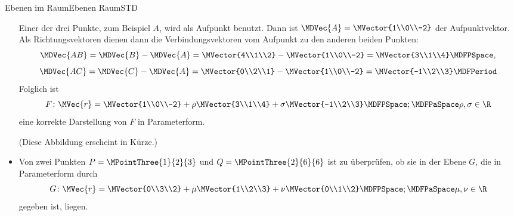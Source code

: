 \begin{MXContent}{Ebenen im Raum}{Ebenen Raum}{STD}
\begin{MExample}
\begin{itemize}
 Einer der drei Punkte, zum Beispiel $A$, wird als Aufpunkt benutzt. Dann ist $\MDVec{A}=\MVector{1\\0\\-2}$ der Aufpunktvektor. Als Richtungsvektoren dienen dann die Verbindungsvektoren vom Aufpunkt zu den anderen beiden Punkten:
 \[
  \MDVec{A B} = \MDVec{B}-\MDVec{A}=\MVector{4\\1\\2}-\MVector{1\\0\\-2}=\MVector{3\\1\\4}\MDFPSpace,
 \]
 \[
  \MDVec{A C} = \MDVec{C}-\MDVec{A}=\MVector{0\\2\\1}-\MVector{1\\0\\-2}=\MVector{-1\\2\\3}\MDFPeriod
 \]
 Folglich ist
 \[
  F\colon\MVec{r}=\MVector{1\\0\\-2}+\rho\MVector{3\\1\\4}+\sigma\MVector{-1\\2\\3}\MDFPSpace;\MDFPaSpace\rho,\sigma\in\R
 \]
 eine korrekte Darstellung von $F$ in Parameterform.
  
 (Diese Abbildung erscheint in Kürze.)
 
 \item Von zwei Punkten $P=\MPointThree{1}{2}{3}$ und $Q=\MPointThree{2}{6}{6}$ ist zu überprüfen, ob sie in der Ebene $G$, die in Parameterform durch
 \[
  G\colon\MVec{r}=\MVector{0\\3\\2}+\mu\MVector{1\\2\\3}+\nu\MVector{0\\1\\2}\MDFPSpace;\MDFPaSpace\mu,\nu\in\R
 \]
 gegeben ist, liegen.
 

\end{itemize}
\end{MExample}
\end{MXContent}
